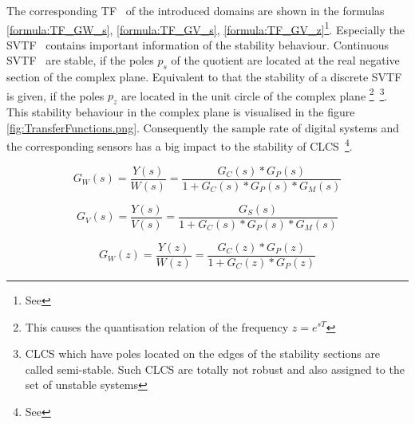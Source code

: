 The corresponding \gls{TF}~ of the introduced domains are shown in the formulas
\ref{formula:TF_GW_s}, \ref{formula:TF_GV_s},
\ref{formula:TF_GV_z}\footnote{See }. Especially the \gls{SVTF}~
contains important information of the stability behaviour. Continuous \gls{SVTF}~
are stable, if the poles \ensuremath{p_{s}} of the quotient are located at the real negative section of the complex plane. 
Equivalent to that the stability of a discrete \gls{SVTF}~ is given, if the poles \ensuremath{p_{z}} are
located in the unit circle of the complex plane \footnote{This causes the
quantisation relation of the frequency \ensuremath{z=e^{sT}}}~\footnote{\gls{CLCS}
which have poles located on the edges of the stability sections are called
semi-stable. Such \gls{CLCS} are totally not robust and also assigned to the set of
unstable systems}. 
\newpage
This stability behaviour in the complex plane is visualised in
 the figure \ref{fig:TransferFunctions.png}. Consequently the sample rate of
digital systems and the corresponding sensors has a big impact to the stability
of \gls{CLCS}~\footnote{See }.

\begin{equation}
\label{formula:TF_GW_s}
G_{W}(s)=\frac{Y(s)}{W(s)}=\frac{G_{C}(s)*G_{P}(s)}{1+G_{C}(s)*G_{P}(s)*G_{M}(s)}
\end{equation}

\begin{equation}
\label{formula:TF_GV_s}
G_{V}(s)=\frac{Y(s)}{V(s)}=\frac{G_{S}(s)}{1+G_{C}(s)*G_{P}(s)*G_{M}(s)}
\end{equation}

\begin{equation}
\label{formula:TF_GV_z}
G_{W}(z)=\frac{Y(z)}{W(z)}=\frac{G_{C}(z)*G_{P}(z)}{1+G_{C}(z)*G_{P}(z)}
\end{equation}

